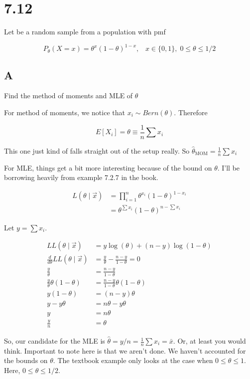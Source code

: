 \section{7.12}

Let \rs be a random sample from a population with pmf

\[
	P_{\theta}(X=x) = \theta^x(1-\theta)^{1-x}, \;\;\; x\in\{0,1\}, \; 0 \leq \theta \leq 1/2
\]

\subsection*{A}

Find the method of moments and MLE of $\theta$

For method of moments, we notice that $x_i \sim Bern(\theta)$. Therefore

\[
	E[X_i] = \theta \equiv \frac{1}{n} \sum x_i
\]

This one just kind of falls straight out of the setup really. So $\hat{\theta}_{\text{MOM}} = \frac{1}{n} \sum x_i$

\noindent For MLE, things get a bit more interesting because of the bound on $\theta$. I'll be borrowing heavily from example 7.2.7 in the book. 

\begin{align*}
	L(\theta \mid \vec{x}) &= \prod_{i=1}^n \theta^{x_i} (1-\theta)^{1-x_i} \\
	&= \theta^{\sum x_i} (1-\theta)^{n - \sum x_i}
\end{align*}

Let $y = \sum x_i$.

\begin{align*}
	LL(\theta \mid \vec{x}) &= y\log(\theta) + (n-y) \log(1-\theta) \\
	\frac{d}{d\theta} LL(\theta \mid \vec{x}) &= \frac{y}{\theta} - \frac{n-y}{1-\theta} = 0 \\
	\frac{y}{\theta} &= \frac{n-y}{1-\theta} \\
	\frac{y}{\theta} \theta(1-\theta) &=  \frac{n-y}{1-\theta} \theta(1-\theta) \\
	y(1-\theta) &= (n-y)\theta \\
	y-y\theta &= n\theta - y\theta \\
	y &= n\theta \\
	\frac{y}{n} &= \theta
\end{align*}

So, our candidate for the MLE is $\hat{\theta} = y/n = \frac{1}{n} \sum x_i = \bar{x}$. Or, at least you would think. Important to note here is that we aren't done. We haven't accounted for the bounds on $\theta$. The textbook example only looks at the case when $0 \leq \theta \leq 1$. Here, $0 \leq \theta \leq 1/2$. 

